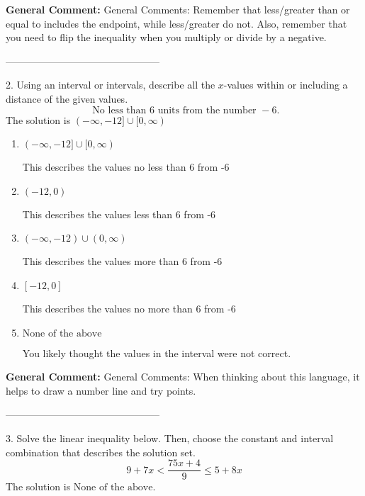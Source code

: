 \documentclass{extbook}[14pt]
\begin{document}
\textbf{General Comment:} General Comments: Remember that less/greater than or equal to includes the endpoint, while less/greater do not. Also, remember that you need to flip the inequality when you multiply or divide by a negative. 

-----------------------------------------------

2. Using an interval or intervals, describe all the $x$-values within or including a distance of the given values.
\[ \text{ No less than } 6 \text{ units from the number } -6. \] 
The solution is $ (-\infty, -12] \cup [0, \infty) $ 

\begin{enumerate}[label=\Alph*.] 
\item $ (-\infty, -12] \cup [0, \infty) $ 

 This describes the values no less than 6 from -6 
\item $ (-12, 0) $ 

 This describes the values less than 6 from -6 
\item $ (-\infty, -12) \cup (0, \infty) $ 

 This describes the values more than 6 from -6 
\item $ [-12, 0] $ 

 This describes the values no more than 6 from -6 
\item $ \text{None of the above} $ 

 You likely thought the values in the interval were not correct. 
\end{enumerate} 
 
\textbf{General Comment:} General Comments: When thinking about this language, it helps to draw a number line and try points. 

-----------------------------------------------

3. Solve the linear inequality below. Then, choose the constant and interval combination that describes the solution set.
\[ 9 + 7 x < \frac{75 x + 4}{9} \leq 5 + 8 x \] 
The solution is $ \text{None of the above.} $ 
\end{document}
